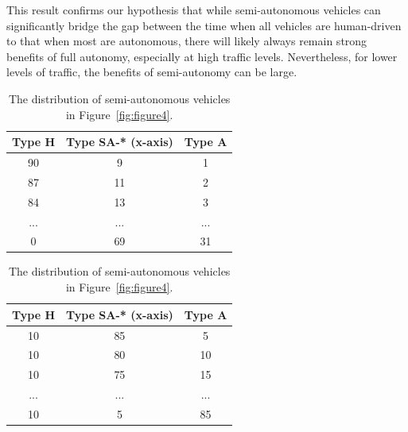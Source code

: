 This result confirms our hypothesis that while semi-autonomous
vehicles can significantly bridge the gap between the time when all
vehicles are human-driven to that when most are autonomous, there will
likely always remain strong benefits of full autonomy, especially at
high traffic levels.  Nevertheless, for lower levels of traffic, the
benefits of semi-autonomy can be large.


\begin{table}[t]
\caption{The distribution of semi-autonomous vehicles in Figure~\ref{fig:figure3}.}
\label{table:3}
\centering
\begin{tabular}{|c|c|c|}
    \hline
    Type H&  Type SA-* (x-axis)&    Type A\\
    \hline
    90&       9&    1\\
    \hline
    87&     11&    2\\
    \hline
    84&     13&    3\\
    \hline
     ...&   ...&   ...\\
    \hline
         0&     69&  31\\
    \hline
\end{tabular}

\mbox{}

\caption{The distribution of semi-autonomous vehicles in Figure~\ref{fig:figure4}.}
\label{table:4}
\centering
\begin{tabular}{|c|c|c|}
    \hline
     Type H&  Type SA-* (x-axis)&    Type A\\
    \hline
     10&     85&    5\\
    \hline
     10&     80&  10\\
    \hline
     10&     75&  15\\
    \hline
      ...&  ...&  ...\\
    \hline
        10&       5&  85\\
    \hline
\end{tabular}

\end{table}


